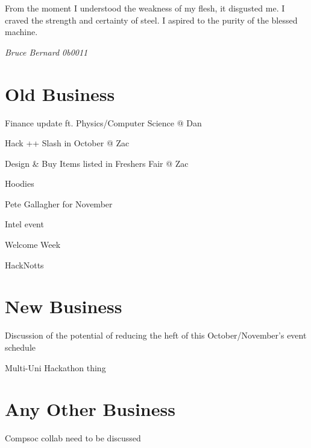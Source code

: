 \documentclass[11pt,hacksoc,agenda]{meetingmins}
\begin{document}
\maketitle

\epigraph{From the moment I understood the weakness of my flesh, it disgusted me. I craved the strength and certainty of steel. I aspired to the purity of the blessed machine.}{\textit{Bruce Bernard 0b0011}}


\section{Old Business}
\begin{items}
\item {Finance update ft. Physics/Computer Science @ Dan}
\item {Hack ++ Slash in October @ Zac}
\item {Design \& Buy Items listed in Freshers Fair @ Zac}
\item {Hoodies}
\item {Pete Gallagher for November}
\item {Intel event}
\item {Welcome Week}
\item {HackNotts}
\end{items}

\section{New Business}
\begin{items}
\item {Discussion of the potential of reducing the heft of this October/November's event schedule}
\item {Multi-Uni Hackathon thing}
\end{items}

\section{Any Other Business}
\begin{items}
  \item {\color{red}Compsoc collab need to be discussed}
\end{items}

\vspace{1em}
\end{document}
